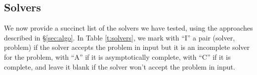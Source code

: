 \subsection{Solvers}\label{subsec:solver}

We now provide a succinct list of the solvers we have tested, using the approaches described in \S \ref{sec:algo}. In Table \ref{t:solvers}, we mark with ``I'' a pair (solver, problem) if the solver accepts the problem in input but it is an incomplete solver for the problem, with ``A'' if it is asymptotically complete, with ``C'' if it is complete, and leave it blank if the solver won't accept the problem in input.

